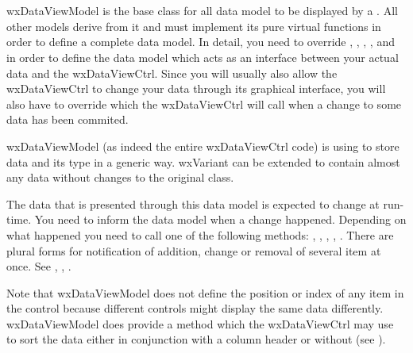 
\section{}\label{wxdataviewmodel}

wxDataViewModel is the base class for all data model to be
displayed by a . 
All other models derive from it and must implement its
pure virtual functions in order to define a complete
data model. In detail, you need to override 
,
,
,
,
 and
 in order to
define the data model which acts as an interface between 
your actual data and the wxDataViewCtrl. Since you will
usually also allow the wxDataViewCtrl to change your data
through its graphical interface, you will also have to override
 which the
wxDataViewCtrl will call when a change to some data has been
commited.

wxDataViewModel (as indeed the entire wxDataViewCtrl
code) is using  to store data and
its type in a generic way. wxVariant can be extended to contain
almost any data without changes to the original class.

The data that is presented through this data model is expected
to change at run-time. You need to inform the data model when
a change happened. Depending on what happened you need to call
one of the following methods: 
,
,
,
,
. There are
plural forms for notification of addition, change
or removal of several item at once. See 
,
,
.

Note that wxDataViewModel does not define the position or
index of any item in the control because different controls
might display the same data differently. wxDataViewModel does
provide a  method
which the wxDataViewCtrl may use to sort the data either
in conjunction with a column header or without (see
).


